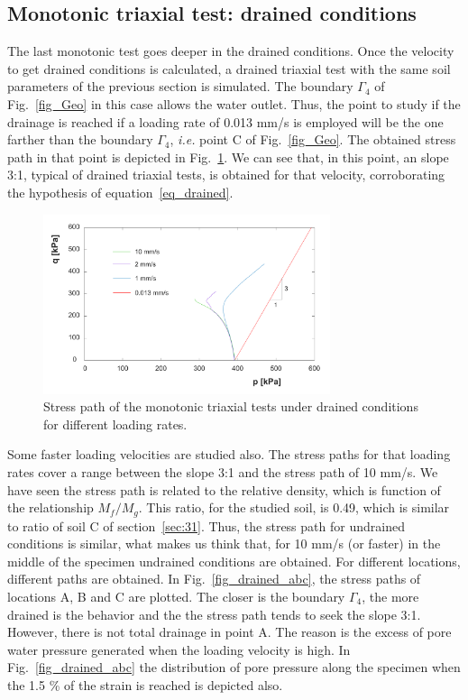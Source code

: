 \documentclass[preprint,12pt,a4paper]{elsarticle}
\begin{document}
\subsection{Monotonic triaxial test: drained conditions}
\label{sec:33}
The last monotonic test goes deeper in the drained conditions. Once the velocity to get drained conditions is calculated, a drained triaxial test with the same soil parameters of the previous section is simulated. The boundary $\Gamma_4$ of Fig.~\ref{fig_Geo} in this case allows the water outlet. Thus, the point to study if the drainage is reached if a loading rate of 0.013 mm/s is employed will be the one farther than the boundary $\Gamma_4$, \textit{i.e.} point C of Fig.~\ref{fig_Geo}.  The obtained stress path in that point is depicted in Fig.~\ref{fig_pq_drained}. We can see that, in this point, an slope 3:1, typical of drained triaxial tests, is obtained for that velocity, corroborating the hypothesis of equation~\eqref{eq_drained}.

\begin{figure}
\centering
\includegraphics[width=0.75\textwidth]{Figs/pq_drained.pdf}
\caption{Stress path of the monotonic triaxial tests under drained conditions for different loading rates.}
\label{fig_pq_drained}
\end{figure}

Some faster loading velocities are studied also. The stress paths for that loading rates cover a range between the slope 3:1 and the stress path of 10 mm/s. We have seen the stress path is related to the relative density, which is function of the relationship $M_f/M_g$. This ratio, for the studied soil, is 0.49, which is similar to ratio of soil C of section~\ref{sec:31}. Thus, the stress path for undrained conditions is similar, what makes us think that, for 10 mm/s (or faster) in the middle of the specimen undrained conditions are obtained. For different locations, different paths are obtained. In Fig.~\ref{fig_drained_abc}, the stress paths of locations A, B and C are plotted. The closer is the boundary  $\Gamma_4$, the more drained is the behavior and the the stress path tends to seek the slope 3:1. However, there is not total drainage in point A. The reason is the excess of pore water pressure generated when the loading velocity is high. In Fig.~\ref{fig_drained_abc} the distribution of pore pressure along the specimen when the 1.5 \% of the strain is reached is depicted also.
\end{document}
